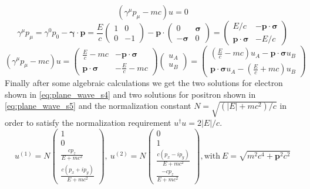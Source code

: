 \begin{equation}
(\gamma^{\mu}p_{\mu}-mc)u=0
\label{eq:plane_wave_s1}
\end{equation}
\begin{equation}
\gamma^{\mu}p_{\mu}=\gamma^{0}p_{0}-\pmb{\gamma}\cdot\mathbf{p}=\frac{E}{c}\begin{pmatrix} 1 & 0 \\ 0 & -1 \end{pmatrix}-\mathbf{p}\cdot \begin{pmatrix} 0 & \pmb{\sigma} \\ -\pmb{\sigma} & 0 \end{pmatrix}=\begin{pmatrix} E/c & -\mathbf{p}\cdot \pmb{\sigma} \\ \mathbf{p}\cdot \pmb{\sigma} & -E/c \end{pmatrix}
\label{eq:plane_wave_s2}
\end{equation}
\begin{equation}
(\gamma^{\mu}p_{\mu}-mc)u=\begin{pmatrix} \frac{E}{c}-mc & -\mathbf{p}\cdot \pmb{\sigma} \\ \mathbf{p}\cdot \pmb{\sigma} & -\frac{E}{c}-mc \end{pmatrix}\begin{pmatrix} u_{A} \\ u_{B} \end{pmatrix}=\begin{pmatrix} (\frac{E}{c}-mc)u_{A} -\mathbf{p}\cdot \pmb{\sigma}u_{B} \\ \mathbf{p}\cdot \pmb{\sigma}u_{A}-(\frac{E}{c}+mc)u_{B} \end{pmatrix}
\label{eq:plane_wave_s3}
\end{equation}
Finally after some algebraic calculations we get the two solutions for electron shown in \ref{eq:plane_wave_s4} and two solutions for positron shown in \ref{eq:plane_wave_s5} and the normalization constant $N=\sqrt{(|E|+mc^{2})/c}$ in order to satisfy the normalization requirement $u^{\dag}u=2|E|/c$.
\begin{equation}
u^{(1)}=N\begin{pmatrix} 1 \\ 0 \\ \frac{cp_{z}}{E+mc^{2}} \\ \frac{c(p_{x}+ip_{y})}{E+mc^{2}} \end{pmatrix},~
u^{(2)}=N\begin{pmatrix} 0 \\ 1 \\ \frac{c(p_{x}-ip_{y})}{E+mc^{2}} \\ \frac{-cp_{z}}{E+mc^{2}} \end{pmatrix}, \mathrm{with}~E=\sqrt{m^{2}c^{4}+\mathbf{p}^{2}c^{2}}
\label{eq:plane_wave_s4}
\end{equation}

